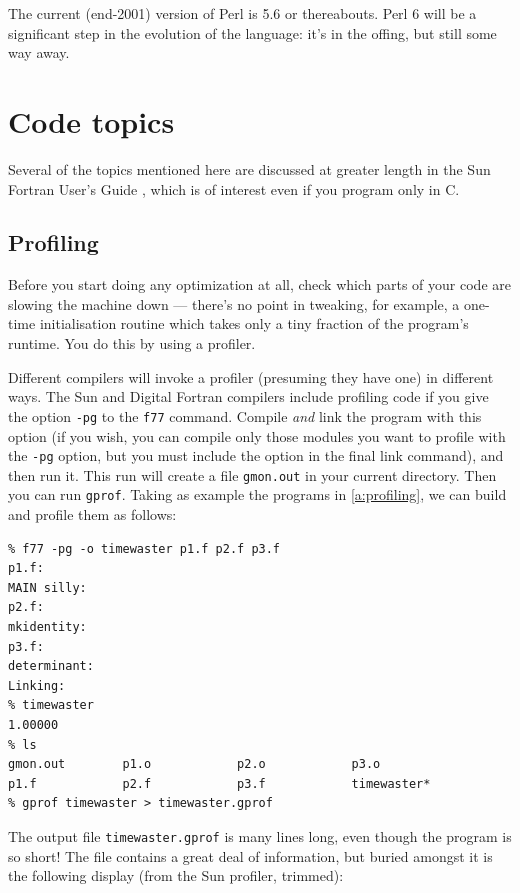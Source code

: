 \documentclass[11pt,oneside,chapters]{starlink}
\begin{document}
The current (end-2001) version of
Perl is 5.6 or thereabouts.  Perl 6 will be a
significant step in the evolution of the language: it's
in the offing, but still some way away.


\section{Code topics}
\label{s:codetopics}

Several of the topics mentioned here are discussed at greater length
in the Sun Fortran User's Guide \citep{sunf77}, which is of interest
even if you program only in C.

\subsection{Profiling}
\label{s:profiling}

Before you start doing any optimization at all, check which parts of
your code are slowing the machine down --- there's no point in
tweaking, for example, a one-time initialisation routine which takes
only a tiny fraction of the program's runtime.  You do this by using a
profiler.

Different compilers will invoke a profiler (presuming
they have one) in different ways.  The Sun and Digital
Fortran compilers include profiling code if you give the
option \texttt{-pg} to the \texttt{f77} command.
Compile \emph{and} link the program with this option (if
you wish, you can compile only those modules you want to
profile with the \texttt{-pg} option, but you must
include the option in the final link command), and then
run it.  This run will create a file \texttt{gmon.out}
in your current directory.  Then you can run
\texttt{gprof}.  Taking as example the programs in
\ref{a:profiling}, we can build and profile them as
follows:

\begin{verbatim}
% f77 -pg -o timewaster p1.f p2.f p3.f
p1.f:
MAIN silly:
p2.f:
mkidentity:
p3.f:
determinant:
Linking:
% timewaster
1.00000
% ls
gmon.out        p1.o            p2.o            p3.o
p1.f            p2.f            p3.f            timewaster*
% gprof timewaster > timewaster.gprof
\end{verbatim}

The output file \texttt{timewaster.gprof} is many lines long, even
though the program is so short!  The file contains a great deal of
information, but buried amongst it is the following display (from the
Sun profiler, trimmed):
\end{document}
